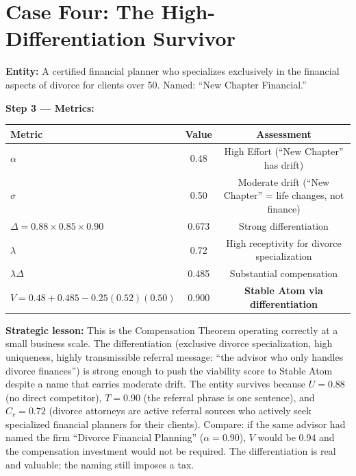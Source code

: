 \documentclass[12pt, openany]{book}
\theoremstyle{thmstyle}
\theoremstyle{defstyle}
\begin{document}
\section{Case Four: The High-Differentiation Survivor}

\begin{casebox}
\textbf{Entity:} A certified financial planner who specializes exclusively in the financial aspects of divorce for clients over 50. Named: ``New Chapter Financial.''

\textbf{Step 3 --- Metrics:}
\begin{center}
\begin{tabular}{lcc}
\toprule
Metric & Value & Assessment \\
\midrule
$\alpha$ & 0.48 & High Effort (``New Chapter'' has drift) \\
$\sigma$ & 0.50 & Moderate drift (``New Chapter'' = life changes, not finance) \\
$\Delta = 0.88 \times 0.85 \times 0.90$ & 0.673 & Strong differentiation \\
$\lambda$ & 0.72 & High receptivity for divorce specialization \\
$\lambda\Delta$ & 0.485 & Substantial compensation \\
$V = 0.48 + 0.485 - 0.25(0.52)(0.50)$ & 0.900 & \textbf{Stable Atom via differentiation} \\
\bottomrule
\end{tabular}
\end{center}

\textbf{Strategic lesson:} This is the Compensation Theorem operating correctly at a small business scale. The differentiation (exclusive divorce specialization, high uniqueness, highly transmissible referral message: ``the advisor who only handles divorce finances'') is strong enough to push the viability score to Stable Atom despite a name that carries moderate drift. The entity survives because $U = 0.88$ (no direct competitor), $T = 0.90$ (the referral phrase is one sentence), and $C_r = 0.72$ (divorce attorneys are active referral sources who actively seek specialized financial planners for their clients). Compare: if the same advisor had named the firm ``Divorce Financial Planning'' ($\alpha = 0.90$), $V$ would be 0.94 and the compensation investment would not be required. The differentiation is real and valuable; the naming still imposes a tax.
\end{casebox}
\end{document}
